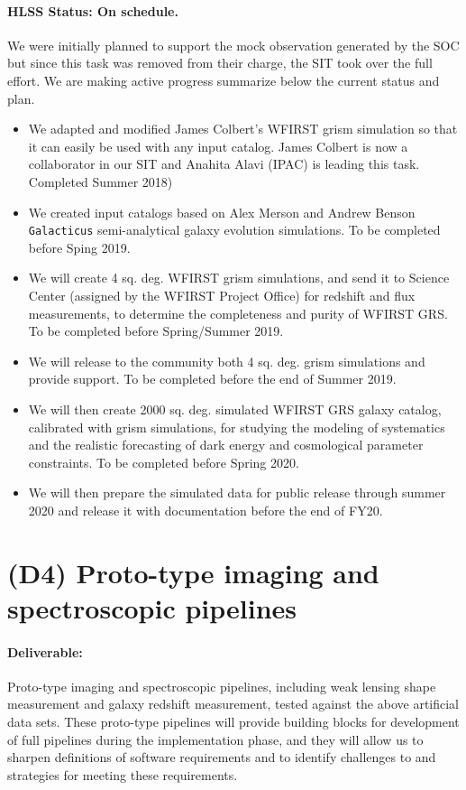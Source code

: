 \paragraph*{HLSS Status: On schedule.} We were initially planned to support the mock observation generated by the SOC but since this task was removed from their charge, the SIT took over the full effort. We are making active progress summarize below the current status and plan.
\begin{itemize}
\item We adapted and modified James Colbert's WFIRST grism simulation so that it can easily be used with any input catalog. James Colbert is now a collaborator in our SIT and Anahita Alavi (IPAC) is leading this task. Completed Summer 2018)
\item We created input catalogs based on Alex Merson and Andrew Benson \texttt{Galacticus} semi-analytical galaxy evolution simulations. To be completed before Sping 2019.
\item We will create 4 sq. deg. WFIRST grism simulations, and send it to Science Center (assigned by the WFIRST Project Office) for redshift and flux measurements, to determine the completeness and purity of WFIRST GRS. To be completed before Spring/Summer 2019.
\item We will release to the community both 4 sq. deg. grism simulations and provide support. To be completed before the end of Summer 2019.
\item We will then create 2000 sq. deg. simulated WFIRST GRS galaxy catalog, calibrated with grism simulations, for studying the modeling of systematics and the realistic forecasting of dark energy and cosmological parameter constraints. To be completed before Spring 2020.
\item We will then prepare the simulated data for public release through summer 2020 and release it with documentation before the end of FY20.
\end{itemize}


\section*{(D4) Proto-type imaging and spectroscopic pipelines}

\paragraph*{Deliverable:} Proto-type imaging and spectroscopic pipelines,
including weak lensing shape measurement and galaxy redshift measurement, tested
against the above artificial data sets. These proto-type pipelines will provide
building blocks for development of full pipelines during the implementation
phase, and they will allow us to sharpen definitions of software requirements
and to identify challenges to and strategies for meeting these requirements.

